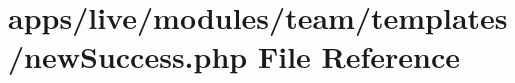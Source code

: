 \hypertarget{live_2modules_2team_2templates_2new_success_8php}{\section{apps/live/modules/team/templates/new\-Success.php File Reference}
\label{live_2modules_2team_2templates_2new_success_8php}
}
